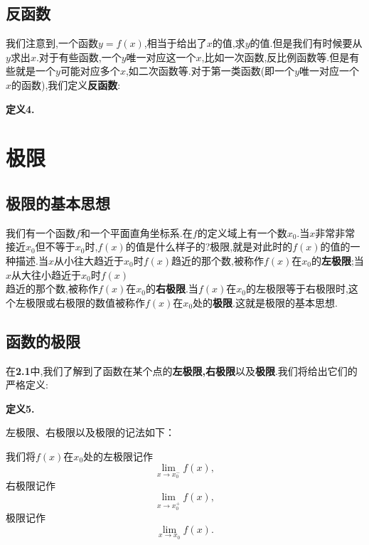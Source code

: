 \documentclass{article}
\begin{document}
\subsection{反函数}
我们注意到,一个函数$y=f(x)$,相当于给出了$x$的值,求$y$的值.但是我们有时候要从$y$求出$x$.对于有些函数,一个$y$唯一对应这一个$x$,比如一次函数,反比例函数等.但是有些就是一个$y$可能对应多个$x$,如二次函数等.对于第一类函数(即一个$y$唯一对应一个$x$的函数),我们定义\textbf{反函数}:
\par\textbf{定义4.}
\newpage
\section{极限}
\subsection{极限的基本思想}
{我们有一个函数$f$和一个平面直角坐标系.在$f$的定义域上有一个数$x_0$.当$x$非常非常接近$x_0$但不等于$x_0$时,$f(x)$的值是什么样子的?极限,就是对此时的$f(x)$的值的一种描述.当$x$从小往大趋近于$x_0$时$f(x)$趋近的那个数,被称作$f(x)$在$x_0$的\textbf{左极限};当$x$从大往小趋近于$x_0$时$f(x)$\\趋近的那个数,被称作$f(x)$在$x_0$的\textbf{右极限}.当$f(x)$在$x_0$的左极限等于右极限时,这个左极限或右极限的数值被称作$f(x)$在$x_0$处的\textbf{极限}.这就是极限的基本思想.}

\subsection{函数的极限}
在\textbf{2.1}中,我们了解到了函数在某个点的\textbf{左极限,右极限}以及\textbf{极限}.我们将给出它们的严格定义:
\par\textbf{定义5.}
\par 左极限、右极限以及极限的记法如下：
\par 我们将$f(x)$在$x_0$处的左极限记作
\[\lim\limits_{x\to x_0^-}f(x),\]
右极限记作
\[\lim\limits_{x\to x_0^+}f(x),\]
极限记作
\[\lim\limits_{x\to x_0}f(x).\]
\end{document}
